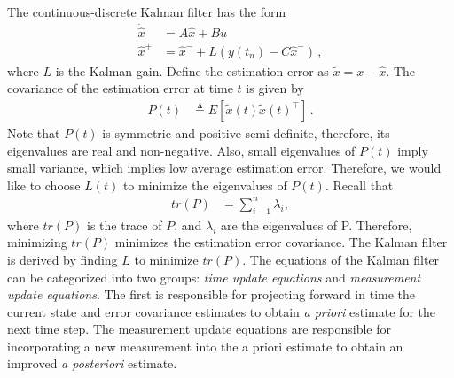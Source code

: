 The continuous-discrete Kalman filter has the form
\begin{align}
\dot{\hat{x}}&=A\hat{x}+Bu \\
\hat{x}^+&=\hat{x}^-+L(y(t_n)-C\hat{x}^-)\,,
\end{align}
where $L$ is the Kalman gain.
Define the estimation error as \begin{math} \tilde{x}=x-\hat{x} \end{math}. The covariance of the estimation error at time \begin{math} t \end{math} is given by
\begin{align}
P(t)&\triangleq E[\tilde{x}(t)\tilde{x}(t)^\top]\,.
\end{align}
Note that \begin{math} P(t) \end{math} is symmetric and positive semi-definite, therefore, its eigenvalues are real and non-negative. Also, small eigenvalues of \begin{math} P(t) \end{math} imply small variance, which implies low average estimation error. Therefore, we would like to choose \begin{math} L(t) \end{math} to minimize the eigenvalues of \begin{math} P(t) \end{math}. Recall that
\begin{align*}
tr(P)&=\sum_{i-1}^{n}\lambda_i, 
\end{align*}
where \begin{math} tr(P) \end{math} is the trace of \begin{math} P \end{math}, and \begin{math} \lambda_i \end{math} are the eigenvalues of P. Therefore, minimizing \begin{math} tr(P) \end{math} minimizes the estimation error covariance. The Kalman filter is derived by finding \begin{math} L \end{math} to minimize \begin{math} tr(P) \end{math}.
The equations of the Kalman filter can be categorized into two groups: \textit{time update equations} and \textit{measurement update equations}. The first is responsible for projecting forward in time the current state and error covariance estimates to obtain \textit{a priori} estimate for the next time step. The measurement update equations are responsible for incorporating a new measurement into the a priori estimate to obtain an improved \textit{a posteriori} estimate.

